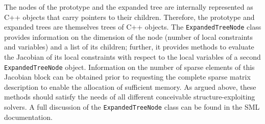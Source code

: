 \documentclass[10pt,a4paper]{report}
\begin{document}
The nodes of the prototype and the expanded tree are internally
represented as C++ objects that carry pointers to their children. 
Therefore, the prototype and expanded trees are themselves trees of C++ objects.
The {\tt ExpandedTreeNode} class provides information on the dimension
of the node (number of local constraints and variables) and a list of
its children; further, it provides methods to evaluate the Jacobian of
its local constraints with respect to the local variables of a second
{\tt ExpandedTreeNode} object. Information on the number of sparse
elements of this Jacobian block can be obtained prior to requesting
the complete sparse matrix description to enable the allocation of
sufficient memory. As argued above, these methods should satisfy
the needs of all different conceivable structure-exploiting solvers. A
full discussion of the {\tt ExpandedTreeNode} class can be found in
the SML documentation.




%
%
\end{document}
